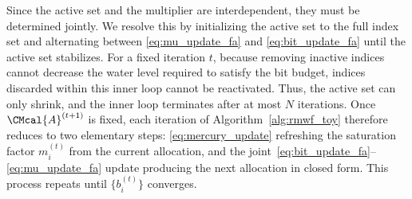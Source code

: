 \documentclass[10pt, twocolumn, comsoc]{IEEEtran}
\begin{document}
Since the active set and the multiplier are interdependent, they must be determined jointly. 
We resolve this by initializing the active set to the full index set and alternating between \eqref{eq:mu_update_fa} and \eqref{eq:bit_update_fa} until the active set stabilizes. 
For a fixed iteration $t$, because removing inactive indices cannot decrease the water level required to satisfy the bit budget, indices discarded within this inner loop cannot be reactivated. 
Thus, the active set can only shrink, and the inner loop terminates after at most $N$ iterations.
Once $\CMcal{A}^{(t+1)}$ is fixed, each iteration of Algorithm~\ref{alg:rmwf_toy} therefore reduces to two elementary steps: \eqref{eq:mercury_update} refreshing the saturation factor $m_i^{(t)}$ from the current allocation, and the joint~\eqref{eq:bit_update_fa}--\eqref{eq:mu_update_fa} update producing the next allocation in closed form. 
This process repeats until $\{b_i^{(t)}\}$ converges.

\end{document}
